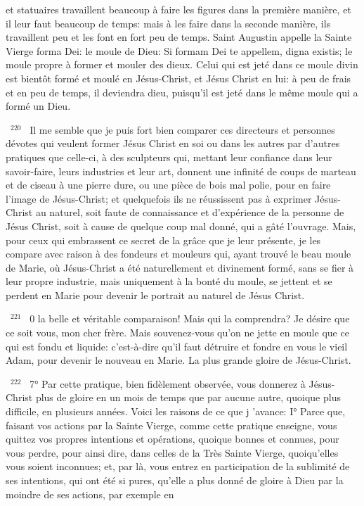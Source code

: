 \documentclass[paper=a5,pagesize=pdftex,fontsize=15pt,headinclude=on,twoside=off]{scrbook}
\newcommand{\negphantom}[1]{\settowidth{\dimen0}{#1}\hspace*{-\dimen0}}
\newcommand{\versenb}[1]{\par \vspace{10pt}~\negphantom{~${}^{#1}$~}${}^{#1}$~}
\begin{document}
et statuaires travaillent beaucoup à faire les figures dans la première manière, et il leur faut beaucoup de temps:
mais à les faire dans la seconde manière, ils travaillent peu et les font en fort peu de temps. Saint Augustin appelle
la Sainte Vierge forma Dei: le moule de Dieu: Si formam Dei te appellem, digna existis; le moule propre à former et
mouler des dieux. Celui qui est jeté dans ce moule divin est bientôt formé et moulé en Jésus-Christ, et Jésus Christ en lui: à peu de frais et en peu de temps, il deviendra dieu, puisqu'il est jeté dans le même moule qui a
formé un Dieu.
\versenb{220} Il me semble que je puis fort bien comparer ces directeurs et personnes dévotes qui veulent former Jésus Christ en soi ou dans les autres par d'autres pratiques que celle-ci, à des sculpteurs qui, mettant leur confiance
dans leur savoir-faire, leurs industries et leur art, donnent une infinité de coups de marteau et de ciseau à une
pierre dure, ou une pièce de bois mal polie, pour en faire l'image de Jésus-Christ; et quelquefois ils ne réussissent
pas à exprimer Jésus-Christ au naturel, soit faute de connaissance et d'expérience de la personne de Jésus Christ, soit à cause de quelque coup mal donné, qui a gâté l'ouvrage. Mais, pour ceux qui embrassent ce secret de
la grâce que je leur présente, je les compare avec raison à des fondeurs et mouleurs qui, ayant trouvé le beau
moule de Marie, où Jésus-Christ a été naturellement et divinement formé, sans se fier à leur propre industrie, mais
uniquement à la bonté du moule, se jettent et se perdent en Marie pour devenir le portrait au naturel de Jésus Christ.
\versenb{221} 0 la belle et véritable comparaison! Mais qui la comprendra? Je désire que ce soit vous, mon cher frère. Mais
souvenez-vous qu'on ne jette en moule que ce qui est fondu et liquide: c'est-à-dire qu'il faut détruire et fondre en
vous le vieil Adam, pour devenir le nouveau en Marie.
La plus grande gloire de Jésus-Christ.
\versenb{222} 7° Par cette pratique, bien fidèlement observée, vous donnerez à Jésus-Christ plus de gloire en un mois de
temps que par aucune autre, quoique plus difficile, en plusieurs années. Voici les raisons de ce que j 'avance:
I° Parce que, faisant vos actions par la Sainte Vierge, comme cette pratique enseigne, vous quittez vos propres
intentions et opérations, quoique bonnes et connues, pour vous perdre, pour ainsi dire, dans celles de la Très
Sainte Vierge, quoiqu'elles vous soient inconnues; et, par là, vous entrez en participation de la sublimité de ses
intentions, qui ont été si pures, qu'elle a plus donné de gloire à Dieu par la moindre de ses actions, par exemple en
\end{document}
